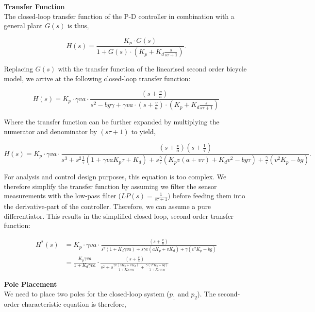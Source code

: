 \documentclass[a4paper]{article}
\begin{document}

\textbf{Transfer Function} \\
The closed-loop transfer function of the P-D controller in combination with a general plant $G(s)$ is thus,

\begin{equation*}
H(s) = \frac{K_p \cdot G(s)}{1 + G(s) \cdot (K_p + K_d \frac{s}{s \tau + 1})}.
\end{equation*}

Replacing $G(s)$ with the transfer function of the linearised second order bicycle model, we arrive at the following closed-loop transfer function:

\begin{equation}
H(s) = K_p \cdot \gamma v a \cdot \frac{(s + \frac{v}{a})}{s^2 - b g \gamma + \gamma v a \cdot (s + \frac{v}{a}) \cdot (K_p + K_d \frac{s}{s \tau + 1})}
\end{equation}

Where the transfer function can be further expanded by multiplying the numerator and denominator by $(s \tau + 1)$ to yield,

\begin{equation*}
H(s) = K_p \cdot \gamma v a \cdot \frac{(s+\frac{v}{a}) (s + \frac{1}{\tau})}{s^3 + s^2 \frac{1}{\tau} (1 + \gamma v a K_p \tau + K_d) + s \frac{\gamma}{\tau} (K_p v (a + v \tau) + K_d v^2 - b g \tau) + \frac{\gamma}{\tau} (v^2 K_p - b g)}.
\end{equation*}

For analysis and control design purposes, this equation is too complex. We therefore simplify the transfer function by assuming we filter the sensor measurements with the low-pass filter ($LP(s)=\frac{1}{s \tau + 1}$) before feeding them into the derivative-part of the controller. Therefore, we can assume a pure differentiator. This results in the simplified closed-loop, second order transfer function:

\begin{align*}
H^*(s) &= K_p \cdot \gamma v a \cdot \frac{(s + \frac{v}{a})}{s^2 (1 + K_d \gamma v a) + s \gamma v (a K_p + v K_d) + \gamma (v^2 K_p - b g)} \\
&= \frac{K_p \gamma v a}{1 + K_d \gamma v a} \cdot \frac{(s + \frac{v}{a})}{s^2 + s \frac{\gamma v (a K_p + v K_d)}{1 + K_d \gamma v a} + \frac{\gamma (v^2 K_p - b g)}{1 + K_d \gamma v a}}
\end{align*}

\textbf{Pole Placement} \\
We need to place two poles for the closed-loop system ($p_1$ and $p_2$). The second-order characteristic equation is therefore,
\end{document}

